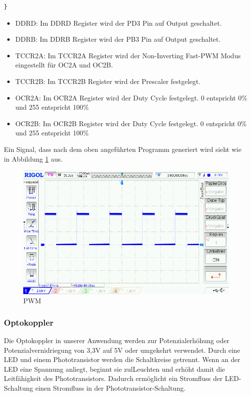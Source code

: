 \begin{itemize}
\begin{lstlisting}[caption=$\mu$C-Programm,style=C]
}
\end{lstlisting}
\newpage
\begin{itemize}
\item DDRD: Im DDRD Register wird der PD3 Pin auf Output geschaltet.
\item DDRB: Im DDRB Register wird der PB3 Pin auf Output geschaltet.
\item TCCR2A: Im TCCR2A Register wird der Non-Inverting Fast-PWM Modus eingestellt für OC2A und OC2B. 
\item TCCR2B: Im TCCR2B Register wird der Prescaler festgelegt. 
\item OCR2A: Im OCR2A Register wird der Duty Cycle festgelegt. 0 entspricht 0\% und 255 entspricht 100\% 
\item OCR2B: Im OCR2B Register wird der Duty Cycle festgelegt. 0 entspricht 0\% und 255 entspricht 100\% 
\end{itemize}
\end{itemize}

Ein Signal, dass nach dem oben angeführten Programm generiert wird sieht wie in Abbildung \ref{PWM} aus.
\begin{figure}[H] 
\begin{center}

\includegraphics[width=13cm]{Bilder/PWM/pwm}
\caption{PWM}
\label{PWM}

\end{center}
\end{figure}
\newpage
\subsubsection{Optokoppler}

Die Optokoppler in unserer Anwendung werden zur Potenzialerhöhung oder Potenzialvernidriegung von 3,3V auf 5V oder umgekehrt verwendet. Durch eine LED und einem Phototransistor werden die Schaltkreise getrennt. Wenn an der LED eine Spannung anliegt, beginnt sie zulLeuchten und erhöht damit die Leitfähigkeit des Phototransistors. Dadurch ermöglicht ein Stromfluss der LED-Schaltung einen Stromfluss in der Phototransistor-Schaltung.

